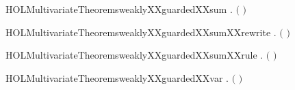 \newcommand{\HOLMultivariateTheoremsweaklyXXguardedXXrules}{\UseVerbatim{HOLMultivariateTheoremsweaklyXXguardedXXrules}}
\begin{SaveVerbatim}{HOLMultivariateTheoremsweaklyXXguardedXXsum}
\HOLTokenTurnstile{} \HOLSymConst{\HOLTokenForall{}}  .
         \ensuremath{(} \HOLSymConst{\ensuremath{+}} \ensuremath{)} \HOLSymConst{\HOLTokenImp{}}
          \HOLSymConst{\HOLTokenConj{}}   
\end{SaveVerbatim}
\newcommand{\HOLMultivariateTheoremsweaklyXXguardedXXsum}{\UseVerbatim{HOLMultivariateTheoremsweaklyXXguardedXXsum}}
\begin{SaveVerbatim}{HOLMultivariateTheoremsweaklyXXguardedXXsumXXrewrite}
\HOLTokenTurnstile{} \HOLSymConst{\HOLTokenForall{}}  .
         \ensuremath{(} \HOLSymConst{\ensuremath{+}} \ensuremath{)} \HOLSymConst{\HOLTokenEquiv{}}
          \HOLSymConst{\HOLTokenConj{}}   
\end{SaveVerbatim}
\newcommand{\HOLMultivariateTheoremsweaklyXXguardedXXsumXXrewrite}{\UseVerbatim{HOLMultivariateTheoremsweaklyXXguardedXXsumXXrewrite}}
\begin{SaveVerbatim}{HOLMultivariateTheoremsweaklyXXguardedXXsumXXrule}
\HOLTokenTurnstile{} \HOLSymConst{\HOLTokenForall{}}  .
          \HOLSymConst{\HOLTokenConj{}}    \HOLSymConst{\HOLTokenImp{}}
         \ensuremath{(} \HOLSymConst{\ensuremath{+}} \ensuremath{)}
\end{SaveVerbatim}
\newcommand{\HOLMultivariateTheoremsweaklyXXguardedXXsumXXrule}{\UseVerbatim{HOLMultivariateTheoremsweaklyXXguardedXXsumXXrule}}
\begin{SaveVerbatim}{HOLMultivariateTheoremsweaklyXXguardedXXvar}
\HOLTokenTurnstile{} \HOLSymConst{\HOLTokenForall{}} .   \ensuremath{(} \ensuremath{)} \HOLSymConst{\HOLTokenImp{}} \HOLSymConst{\HOLTokenNeg{}}  
\end{SaveVerbatim}
